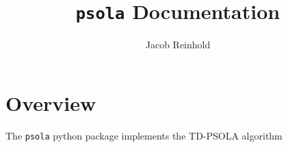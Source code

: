 \documentclass[12pt]{article}
\begin{document}
\title{\texttt{psola} Documentation}
\author{Jacob Reinhold}

\maketitle

\section*{Overview}

The \texttt{psola} python package implements the TD-PSOLA algorithm
\end{document}
